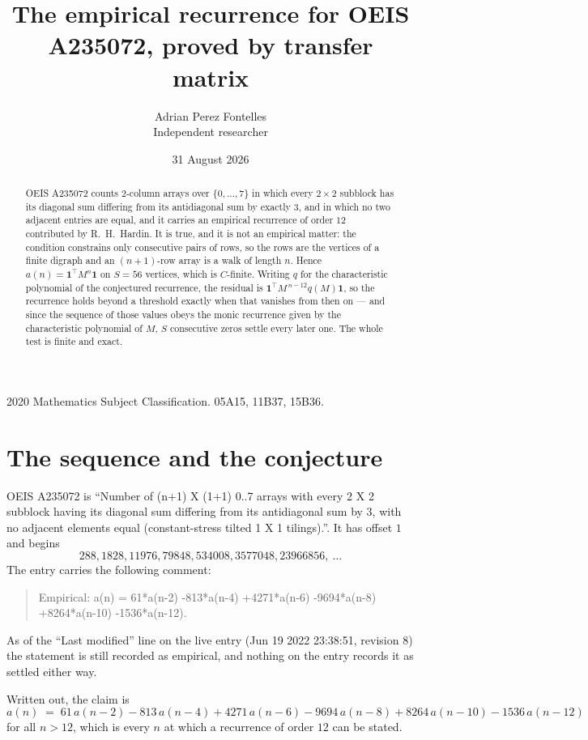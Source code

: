 \documentclass[11pt,a4paper]{article}
\title{The empirical recurrence for OEIS A235072, proved by transfer matrix}
\author{Adrian Perez Fontelles\\ \small Independent researcher}
\date{31 August 2026}
\theoremstyle{plain}
\theoremstyle{definition}
\begin{document}
\maketitle

\begin{abstract}
OEIS A235072 counts $2$-column arrays over $\{0,\dots,7\}$ in which every
$2\times2$ subblock has its diagonal sum differing from its antidiagonal sum by
exactly $3$, and in which no two adjacent entries are equal, and it
carries an empirical recurrence of order $12$ contributed by R.~H.~Hardin. It is true,
and it is not an empirical matter: the condition constrains only consecutive pairs of rows,
so the rows are the vertices of a finite digraph and an $(n+1)$-row array is a walk of
length $n$. Hence $a(n)=\mathbf{1}^{\!\top}M^{n}\mathbf{1}$ on $S=56$ vertices, which
is $C$-finite. Writing $q$ for the characteristic polynomial of the conjectured recurrence,
the residual is $\mathbf{1}^{\!\top}M^{\,n-12}q(M)\mathbf{1}$, so the recurrence
holds beyond a threshold exactly when that vanishes from then on --- and since the sequence
of those values obeys the monic recurrence given by the characteristic polynomial of $M$,
$S$ consecutive zeros settle every later one. The whole test is finite and exact.
\end{abstract}

\noindent\small 2020 Mathematics Subject Classification. 05A15, 11B37, 15B36.\normalsize

\section{The sequence and the conjecture}

OEIS A235072 is ``Number of (n+1) X (1+1) 0..7 arrays with every 2 X 2 subblock having its diagonal sum differing from its antidiagonal sum by 3, with no adjacent elements equal (constant-stress tilted 1 X 1 tilings).''. It has offset
$1$ and begins
\[
288, 1828, 11976, 79848, 534008, 3577048, 23966856,\ \dots
\]
The entry carries the following comment:
\begin{quote}\small
Empirical: a(n) = 61*a(n-2) -813*a(n-4) +4271*a(n-6) -9694*a(n-8) +8264*a(n-10) -1536*a(n-12).
\end{quote}
As of the ``Last modified'' line on the live entry (Jun 19 2022 23:38:51, revision 8) the statement is
still recorded as empirical, and nothing on the entry records it as settled either way.

Written out, the claim is
\begin{equation}\label{eq:conj}
a(n)\;=\;61\,a(n-2) - 813\,a(n-4) + 4271\,a(n-6) - 9694\,a(n-8) + 8264\,a(n-10) - 1536\,a(n-12)
\end{equation}
for all $n>12$, which is every $n$ at which a recurrence of order $12$ can be
stated.
\end{document}
